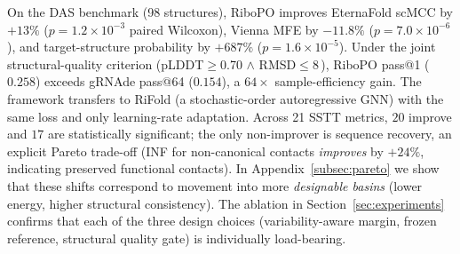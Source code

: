On the DAS benchmark (98 structures), RiboPO improves EternaFold scMCC by $+13\%$ ($p{=}1.2\!\times\!10^{-3}$ paired Wilcoxon), Vienna MFE by $-11.8\%$ ($p{=}7.0\!\times\!10^{-6}$), and target-structure probability by $+687\%$ ($p{=}1.6\!\times\!10^{-5}$). Under the joint structural-quality criterion (pLDDT$\geq$0.70 $\wedge$ RMSD$\leq$8\,\text{\AA}), RiboPO pass@1 ($0.258$) exceeds gRNAde pass@64 ($0.154$), a $64\times$ sample-efficiency gain. The framework transfers to RiFold (a stochastic-order autoregressive GNN) with the same loss and only learning-rate adaptation. Across 21 SSTT metrics, $20$ improve and $17$ are statistically significant; the only non-improver is sequence recovery, an explicit Pareto trade-off (INF for non-canonical contacts \emph{improves} by $+24\%$, indicating preserved functional contacts).
{ In Appendix~\ref{subsec:pareto} we show that these shifts correspond to movement into more \emph{designable basins} (lower energy, higher structural consistency).}
The ablation in Section~\ref{sec:experiments} confirms that each of the three design choices (variability-aware margin, frozen reference, structural quality gate) is individually load-bearing.